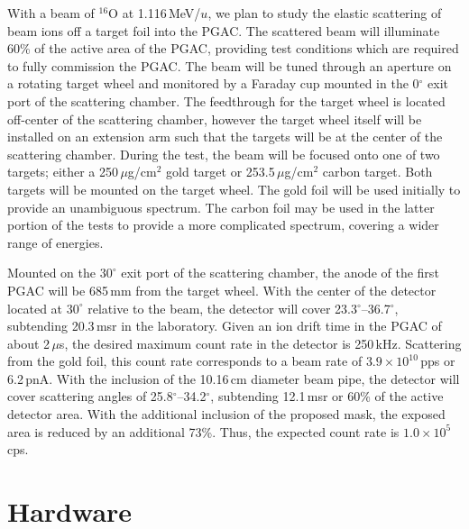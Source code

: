 With a beam of $^{16}$O at 1.116\,MeV/$u$, we plan to  study the elastic %
scattering of beam ions off a target foil into the PGAC. The scattered beam will illuminate 60\%  of the active area of the PGAC, providing test conditions which are required to fully commission the PGAC.  The beam will be tuned through an aperture %
on a  rotating  target wheel and monitored by a Faraday cup mounted in the 0$^\circ$ exit port of the
scattering chamber.  The feedthrough for the target wheel is located off-center of the scattering chamber, however the target wheel itself will be installed on an extension arm such that the targets will be at the center of the scattering chamber. 
During the test, the beam will be focused onto one of two targets; either a 250\,$\mu$g/cm$^2$ gold target or 253.5\,$\mu$g/cm$^2$ carbon %
 target.  Both targets will be mounted on the target wheel. The gold foil will be used initially to provide an unambiguous spectrum.  The carbon foil may be used in the latter portion of the tests to provide a more complicated spectrum, covering a wider range of energies.

Mounted on the $30^\circ$ exit port of the scattering chamber, the %
anode of the first PGAC will be 685\,mm from the target wheel.  With the center of the detector located at $30^\circ$ relative to the beam, the detector will cover 23.3$^\circ$--36.7$^\circ$, subtending 20.3\,msr in the laboratory.  Given an ion drift time in the PGAC of about 2\,$\mu$s, the desired maximum count rate in the detector is 250\,kHz.  Scattering from the gold foil, this count rate corresponds to a beam rate of $3.9 \times 10^{10}$\,pps or 6.2\,pnA. %
With the inclusion of the 10.16\,cm diameter beam pipe, %
the detector will cover scattering angles of 25.8$^\circ$--34.2$^\circ$, subtending 12.1\,msr or 60\% of the active detector area. With the additional inclusion of the proposed mask, the exposed area is reduced by an additional 73\%.   Thus, the expected count rate is $1.0 \times 10^5$\,cps.

\section{Hardware}
